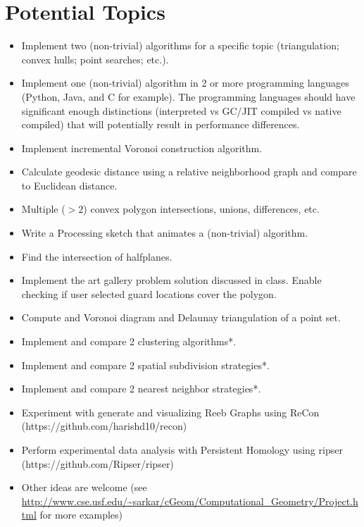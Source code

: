 \documentclass[a4paper,12pt]{article}
\begin{document}
\section{Potential Topics}


\begin{itemize}
    \item Implement two (non-trivial) algorithms for a specific topic (triangulation; convex hulls; point searches; etc.).
    \item Implement one (non-trivial) algorithm in 2 or more programming languages (Python, Java, and C for example). The programming languages should have significant enough distinctions (interpreted vs GC/JIT compiled vs native compiled) that will potentially result in performance differences.
    \item Implement incremental Voronoi construction algorithm.
    \item Calculate geodesic distance using a relative neighborhood graph and compare to Euclidean distance.
    \item Multiple ($>2$) convex polygon intersections, unions, differences, etc.
    \item Write a Processing sketch that animates a (non-trivial) algorithm. 
    \item Find the intersection of halfplanes.
    \item Implement the art gallery problem solution discussed in class. Enable checking if user selected guard locations cover the polygon.
    \item Compute and Voronoi diagram and Delaunay triangulation of a point set.
    \item Implement and compare 2 clustering algorithms*.
	\item Implement and compare 2 spatial subdivision strategies*.
	\item Implement and compare 2 nearest neighbor strategies*.
	\item Experiment with generate and visualizing Reeb Graphs using ReCon (https://github.com/harishd10/recon)
	\item Perform experimental data analysis with Persistent Homology using ripser (https://github.com/Ripser/ripser)
    \item Other ideas are welcome (see \url{http://www.cse.usf.edu/~sarkar/cGeom/Computational_Geometry/Project.html} for more examples)
\end{itemize}
\end{document}
